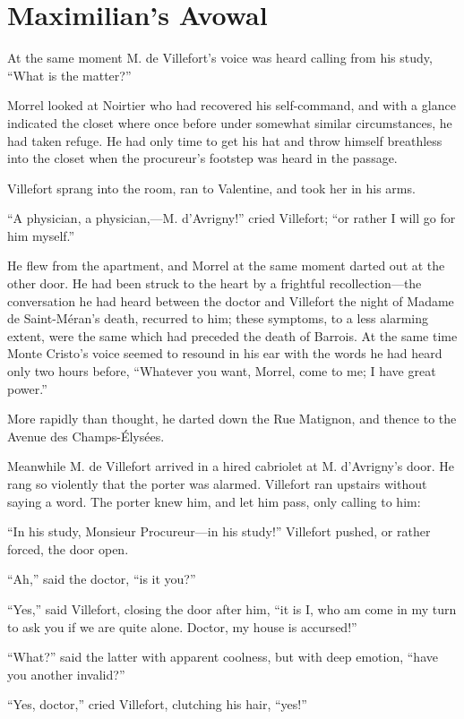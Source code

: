 \chapter{Maximilian’s Avowal}

At the same moment M. de Villefort’s voice was heard calling from his
study, “What is the matter?”

Morrel looked at Noirtier who had recovered his self-command, and with
a glance indicated the closet where once before under somewhat similar
circumstances, he had taken refuge. He had only time to get his hat and
throw himself breathless into the closet when the procureur’s footstep
was heard in the passage.

Villefort sprang into the room, ran to Valentine, and took her in his
arms.

“A physician, a physician,—M. d’Avrigny!” cried Villefort; “or rather I
will go for him myself.”

He flew from the apartment, and Morrel at the same moment darted out at
the other door. He had been struck to the heart by a frightful
recollection—the conversation he had heard between the doctor and
Villefort the night of Madame de Saint-Méran’s death, recurred to him;
these symptoms, to a less alarming extent, were the same which had
preceded the death of Barrois. At the same time Monte Cristo’s voice
seemed to resound in his ear with the words he had heard only two hours
before, “Whatever you want, Morrel, come to me; I have great power.”

More rapidly than thought, he darted down the Rue Matignon, and thence
to the Avenue des Champs-Élysées.

Meanwhile M. de Villefort arrived in a hired cabriolet at M.
d’Avrigny’s door. He rang so violently that the porter was alarmed.
Villefort ran upstairs without saying a word. The porter knew him, and
let him pass, only calling to him:

“In his study, Monsieur Procureur—in his study!” Villefort pushed, or
rather forced, the door open.

“Ah,” said the doctor, “is it you?”

“Yes,” said Villefort, closing the door after him, “it is I, who am
come in my turn to ask you if we are quite alone. Doctor, my house is
accursed!”

“What?” said the latter with apparent coolness, but with deep emotion,
“have you another invalid?”

“Yes, doctor,” cried Villefort, clutching his hair, “yes!”

